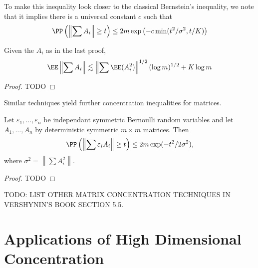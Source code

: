\begin{remark}
    To make this inequality look closer to the classical Bernstein's inequality, we note that it implies there is a universal constant $c$ such that
    \[ \PP \left( \left\| \sum A_i \right\| \geq t \right) \leq 2m \exp \left( -c \min(t^2/\sigma^2, t/K) \right) \]
\end{remark}

\begin{corollary}
    Given the $A_i$ as in the last proof,
    \[ \EE \left\| \sum A_i \right\| \lesssim \left\| \sum \EE(A_i^2) \right\|^{1/2} (\log m)^{1/2} + K \log m \]
\end{corollary}
\begin{proof}
    TODO
\end{proof}

Similar techniques yield further concentration inequalities for matrices.

\begin{theorem}[Hoeffding]
    Let $\varepsilon_1, \dots, \varepsilon_n$ be independant symmetric Bernoulli random variables and let $A_1, \dots, A_n$ by deterministic symmetric $m \times m$ matrices. Then
    \[ \PP \left( \left\| \sum \varepsilon_i A_i \right\| \geq t \right) \leq 2m \exp(-t^2/2\sigma^2), \]
    where $\sigma^2 = \left\| \sum A_i^2 \right\|$.
\end{theorem}
\begin{proof}
    TODO
\end{proof}

TODO: LIST OTHER MATRIX CONCENTRATION TECHNIQUES IN VERSHYNIN'S BOOK SECTION 5.5.







\chapter{Applications of High Dimensional Concentration}

